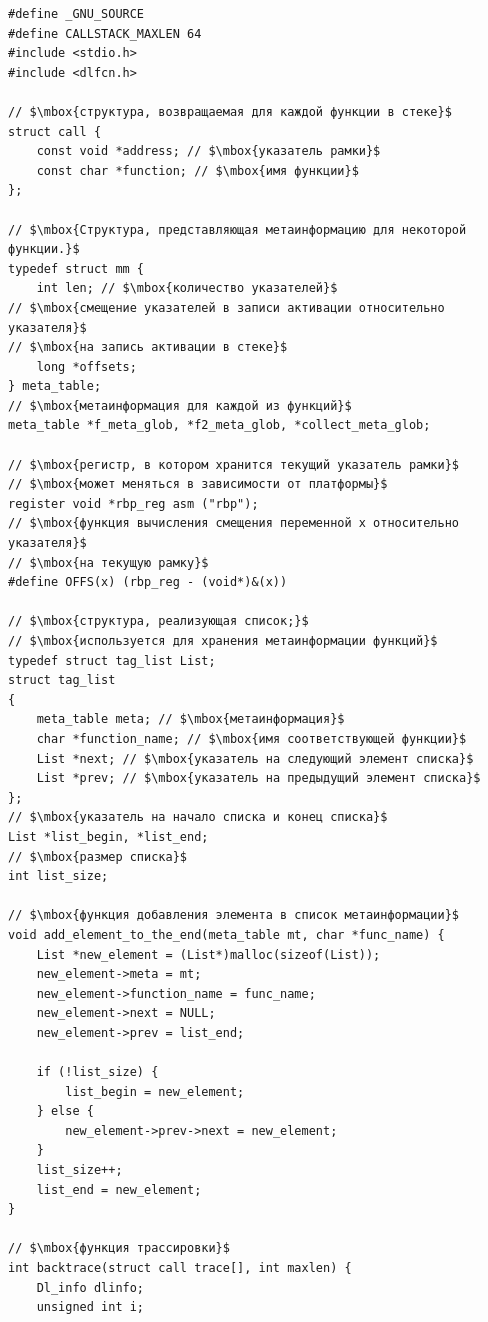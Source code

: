 \documentclass{matmex-diploma}
\begin{document}
\begin{lstlisting}[mathescape=true]
#define _GNU_SOURCE
#define CALLSTACK_MAXLEN 64
#include <stdio.h>
#include <dlfcn.h>

// $\mbox{структура, возвращаемая для каждой функции в стеке}$
struct call {
    const void *address; // $\mbox{указатель рамки}$
	const char *function; // $\mbox{имя функции}$
};

// $\mbox{Структура, представляющая метаинформацию для некоторой функции.}$
typedef struct mm {
	int len; // $\mbox{количество указателей}$
// $\mbox{смещение указателей в записи активации относительно указателя}$
// $\mbox{на запись активации в стеке}$
	long *offsets;
} meta_table;
// $\mbox{метаинформация для каждой из функций}$
meta_table *f_meta_glob, *f2_meta_glob, *collect_meta_glob;

// $\mbox{регистр, в котором хранится текущий указатель рамки}$
// $\mbox{может меняться в зависимости от платформы}$
register void *rbp_reg asm ("rbp");
// $\mbox{функция вычисления смещения переменной x относительно указателя}$
// $\mbox{на текущую рамку}$
#define OFFS(x) (rbp_reg - (void*)&(x))

// $\mbox{структура, реализующая список;}$
// $\mbox{используется для хранения метаинформации функций}$
typedef struct tag_list List;
struct tag_list
{
	meta_table meta; // $\mbox{метаинформация}$
	char *function_name; // $\mbox{имя соответствующей функции}$
	List *next; // $\mbox{указатель на следующий элемент списка}$
	List *prev; // $\mbox{указатель на предыдущий элемент списка}$
};
// $\mbox{указатель на начало списка и конец списка}$
List *list_begin, *list_end;
// $\mbox{размер списка}$
int list_size;

// $\mbox{функция добавления элемента в список метаинформации}$
void add_element_to_the_end(meta_table mt, char *func_name) {
	List *new_element = (List*)malloc(sizeof(List));
	new_element->meta = mt;
	new_element->function_name = func_name;
	new_element->next = NULL;
	new_element->prev = list_end;
	
	if (!list_size)	{
		list_begin = new_element;
	} else {
		new_element->prev->next = new_element;
	}
	list_size++;
	list_end = new_element;
}

// $\mbox{функция трассировки}$
int backtrace(struct call trace[], int maxlen) {
	Dl_info dlinfo;
	unsigned int i;


\end{lstlisting}
\end{document}
